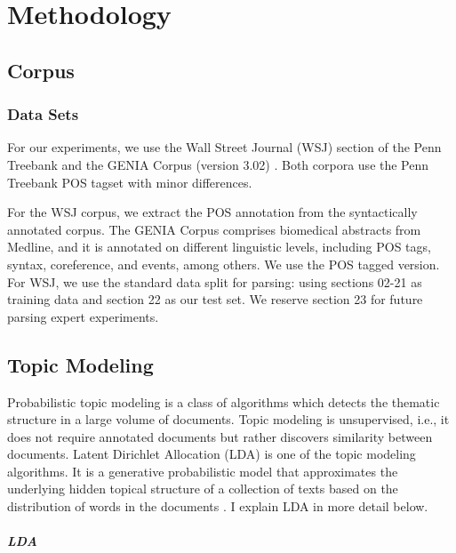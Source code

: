 \chapter{Methodology}




\section{Corpus}
\subsection{Data Sets}


For our experiments, we use the Wall Street Journal (WSJ) section of the Penn Treebank \cite{marcus:kim:ea:94} and the GENIA Corpus (version 3.02) \cite{tateisi:tsujii:04}. Both corpora use the Penn Treebank POS tagset \cite{santorini:90} with minor differences.%

For the WSJ corpus, we extract the POS annotation from the syntactically annotated corpus. The GENIA Corpus comprises biomedical abstracts from Medline, and it is annotated on different linguistic levels, including POS tags, syntax, coreference, and events, among others. We use the POS tagged version. For WSJ, we use the standard data split for parsing:  using sections 02-21 as training data and section 22 as our test set. We reserve section 23 for future parsing expert experiments.


\section{Topic Modeling}

Probabilistic topic modeling is a class of algorithms which detects
the thematic structure in a large volume of documents. Topic modeling
is unsupervised, i.e., it does not require annotated
documents \cite{Blei:2012:PTM:2133806.2133826} but rather discovers similarity between documents. Latent Dirichlet
Allocation (LDA) is one of the topic modeling algorithms. It is a
generative probabilistic model that approximates the underlying hidden topical structure of a collection of texts based on the distribution of words in the documents \cite{Blei:2003:LDA:944919.944937}. I explain LDA in more detail below.

\paragraph*{LDA} 

